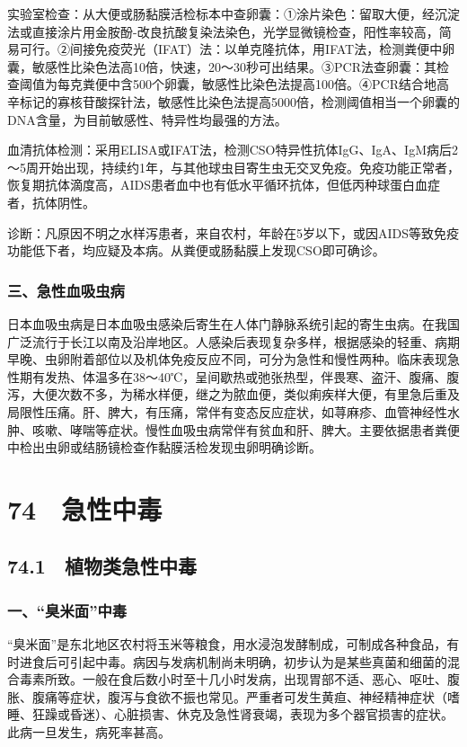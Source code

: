 实验室检查：从大便或肠黏膜活检标本中查卵囊：①涂片染色：留取大便，经沉淀法或直接涂片用金胺酚-改良抗酸复染法染色，光学显微镜检查，阳性率较高，简易可行。②间接免疫荧光（IFAT）法：以单克隆抗体，用IFAT法，检测粪便中卵囊，敏感性比染色法高10倍，快速，20～30秒可出结果。③PCR法查卵囊：其检查阈值为每克粪便中含500个卵囊，敏感性比染色法提高100倍。④PCR结合地高辛标记的寡核苷酸探针法，敏感性比染色法提高5000倍，检测阈值相当一个卵囊的DNA含量，为目前敏感性、特异性均最强的方法。

血清抗体检测：采用ELISA或IFAT法，检测CSO特异性抗体IgG、IgA、IgM病后2～5周开始出现，持续约1年，与其他球虫目寄生虫无交叉免疫。免疫功能正常者，恢复期抗体滴度高，AIDS患者血中也有低水平循环抗体，但低丙种球蛋白血症者，抗体阴性。

诊断：凡原因不明之水样泻患者，来自农村，年龄在5岁以下，或因AIDS等致免疫功能低下者，均应疑及本病。从粪便或肠黏膜上发现CSO即可确诊。

\subsubsection{三、急性血吸虫病}

日本血吸虫病是日本血吸虫感染后寄生在人体门静脉系统引起的寄生虫病。在我国广泛流行于长江以南及沿岸地区。人感染后表现复杂多样，根据感染的轻重、病期早晚、虫卵附着部位以及机体免疫反应不同，可分为急性和慢性两种。临床表现急性期有发热、体温多在38～40℃，呈间歇热或弛张热型，伴畏寒、盗汗、腹痛、腹泻，大便次数不多，为稀水样便，继之为脓血便，类似痢疾样大便，有里急后重及局限性压痛。肝、脾大，有压痛，常伴有变态反应症状，如荨麻疹、血管神经性水肿、咳嗽、哮喘等症状。慢性血吸虫病常伴有贫血和肝、脾大。主要依据患者粪便中检出虫卵或结肠镜检查作黏膜活检发现虫卵明确诊断。

\protect\hypertarget{text00186.html}{}{}

\section{74　急性中毒}

\subsection{74.1　植物类急性中毒}

\subsubsection{一、“臭米面”中毒}

“臭米面”是东北地区农村将玉米等粮食，用水浸泡发酵制成，可制成各种食品，有时进食后可引起中毒。病因与发病机制尚未明确，初步认为是某些真菌和细菌的混合毒素所致。一般在食后数小时至十几小时发病，出现胃部不适、恶心、呕吐、腹胀、腹痛等症状，腹泻与食欲不振也常见。严重者可发生黄疸、神经精神症状（嗜睡、狂躁或昏迷）、心脏损害、休克及急性肾衰竭，表现为多个器官损害的症状。此病一旦发生，病死率甚高。

